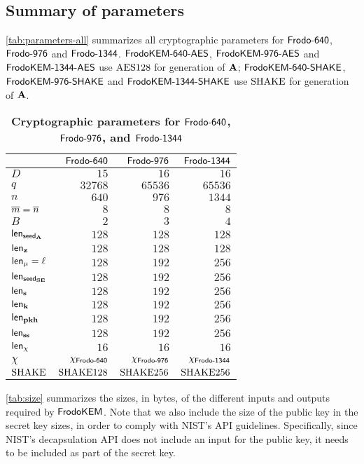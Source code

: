 \documentclass{iacrcc}
\newif\ifshoworiginal
\begin{document}
\ifshoworiginal
\subsection{Summary of parameters}

\autoref{tab:parameters-all} summarizes all cryptographic parameters for $\textsf{\upshape\mdseries Frodo-640}$, $\textsf{\upshape\mdseries Frodo-976}$ and $\textsf{\upshape\mdseries Frodo-1344}$.  $\textsf{\upshape\mdseries FrodoKEM-640-AES}$, $\textsf{\upshape\mdseries FrodoKEM-976-AES}$ and $\textsf{\upshape\mdseries FrodoKEM-1344-AES}$ use $\textrm{\upshape\mdseries AES128}$ for generation of $\mathbf{A}$; $\textsf{\upshape\mdseries FrodoKEM-640-SHAKE}$, $\textsf{\upshape\mdseries FrodoKEM-976-SHAKE}$ and $\textsf{\upshape\mdseries FrodoKEM-1344-SHAKE}$ 
use $\textrm{\upshape\mdseries SHAKE}$ for generation of $\mathbf{A}$.

\begin{table}[h]
\caption{\textbf{Cryptographic parameters for $\textsf{\upshape\mdseries Frodo-640}$, $\textsf{\upshape\mdseries Frodo-976}$, and $\textsf{\upshape\mdseries Frodo-1344}$}}\label{tab:parameters-all}
\begin{center}
\begin{tabular}{l|r|r|r }
\toprule
& $\textsf{\upshape\mdseries Frodo-640}$ & $\textsf{\upshape\mdseries Frodo-976}$ & $\textsf{\upshape\mdseries Frodo-1344}$ \\
\midrule
$D$ & $15$ & $16$ & $16$ \\
$q$ & $32768$ & $65536$ & $65536$ \\
$n$ & $640$ & $976$ & $1344$ \\
$\overline{m}=\overline{n}$ & $8$ & $8$ & $8$ \\
$B$ & $2$ & $3$ & $4$ \\
${\mathsf{len}_{{\mathsf{seed}_{\mathbf{A}}}}}$ & $128$ & $128$ & $128$ \\
${\mathsf{len}_{\mathbf{z}}}$ & $128$ & $128$ & $128$ \\
${\mathsf{len}_{\mu}} = \ell$ & $128$ & $192$ & $256$ \\
${\mathsf{len}_{{\mathsf{seed}_{\mathbf{S}\mathbf{E}}}}}$ & $128$ & $192$ & $256$ \\
${\mathsf{len}_{\mathbf{s}}}$ & $128$ & $192$ & $256$ \\
${\mathsf{len}_{\mathbf{k}}}$ & $128$ & $192$ & $256$ \\
${\mathsf{len}_{\mathbf{p}\mathbf{k}\mathbf{h}}}$ & $128$ & $192$ & $256$ \\
${\mathsf{len}_{\mathbf{s}\mkern-1mu\mathbf{s}}}$ & $128$ & $192$ & $256$ \\
${\mathsf{len}_{\chi}}$ & $16$ & $16$ & $16$ \\
$\chi$ & $\chi_\textsf{\upshape\mdseries Frodo-640}$ & $\chi_\textsf{\upshape\mdseries Frodo-976}$ & $\chi_\textsf{\upshape\mdseries Frodo-1344}$ \\
$\textrm{\upshape\mdseries SHAKE}$ & $\textrm{\upshape\mdseries SHAKE}128$ & $\textrm{\upshape\mdseries SHAKE}256$ & $\textrm{\upshape\mdseries SHAKE}256$ \\
\bottomrule
\end{tabular}
\end{center}
\end{table}

\autoref{tab:size} summarizes the sizes, in bytes, of the different
inputs and outputs required by
$\textsf{\upshape\mdseries FrodoKEM}$. %
Note that we also include the size of the public key in the secret key
sizes, in order to comply with NIST's API guidelines.  Specifically,
since NIST's decapsulation API does not include an input for the
public key, it needs to be included as part of the secret key.
\end{document}
